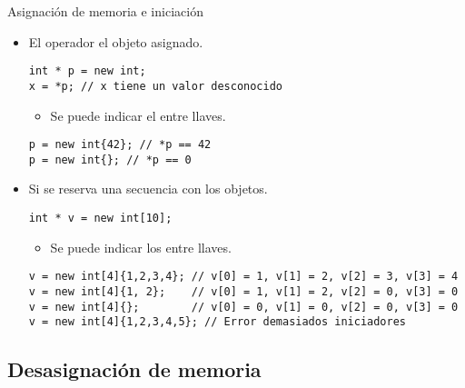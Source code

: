 \begin{frame}[t,fragile]{Asignación de memoria e iniciación}
\begin{itemize}
  \item El operador   el objeto asignado.
\begin{lstlisting}
int * p = new int;
x = *p; // x tiene un valor desconocido
\end{lstlisting}
    \begin{itemize}
      \item Se puede indicar el  entre llaves.
    \end{itemize}
\begin{lstlisting}
p = new int{42}; // *p == 42
p = new int{}; // *p == 0
\end{lstlisting}

  \item Si se reserva una secuencia con  
         los objetos.
\begin{lstlisting}
int * v = new int[10];
\end{lstlisting}
    \begin{itemize}
      \item Se puede indicar los  entre llaves.
    \end{itemize}
\begin{lstlisting}
v = new int[4]{1,2,3,4}; // v[0] = 1, v[1] = 2, v[2] = 3, v[3] = 4
v = new int[4]{1, 2};    // v[0] = 1, v[1] = 2, v[2] = 0, v[3] = 0
v = new int[4]{};        // v[0] = 0, v[1] = 0, v[2] = 0, v[3] = 0
v = new int[4]{1,2,3,4,5}; // Error demasiados iniciadores
\end{lstlisting}
\end{itemize}
\end{frame}

\subsection{Desasignación de memoria}

